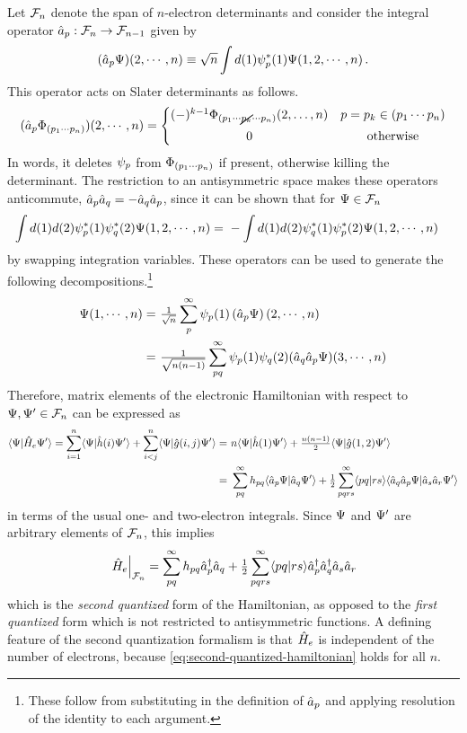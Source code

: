 \documentclass[11pt]{article}
\numberwithin{equation}{section}
\begin{document}
Let $\mathcal{F}_n$ denote the span of $n$-electron determinants and consider the integral operator $\hat{a}_p:\mathcal{F}_n\rightarrow \mathcal{F}_{n-1}$ given by
\begin{align}
  (\hat{a}_p\Psi )(2,\cdots,n)
\equiv
  \sqrt{n}\int d(1) \psi _p^*(1)\Psi (1,2,\cdots,n)\,.
\end{align}
This operator acts on Slater determinants as follows.
\begin{align}
  (\op{a}_p\F_{(p_1\cd p_n)})(2,\cd,n)
=
\left\{
\ar{
  (-)^{k-1}\F_{(p_1\cd \cancel{p_k}\cd p_n)}(2,\ld,n) & p=p_k\in(p_1\cd p_n)\\[5pt]
  0 & \text{otherwise}
}
\right.
\end{align}
In words, it deletes $\psi _p$ from $\Phi _{(p_1\cdots p_n)}$ if present, otherwise killing the determinant.
The restriction to an antisymmetric space makes these operators anticommute, $\hat{a}_p\hat{a}_q=-\hat{a}_q\hat{a}_p$, since it can be shown that for $\Psi \in\mathcal{F}_n$
\begin{align*}
  \int d(1)d(2)\psi _p^*(1)\psi _q^*(2)\Psi (1,2,\cdots,n)
=&\
-
  \int d(1)d(2)\psi _q^*(1)\psi _p^*(2)\Psi (1,2,\cdots,n)
\end{align*}
by swapping integration variables.
These operators can be used to generate the following decompositions.\footnote{These follow from substituting in the definition of $\hat{a}_p$ and applying resolution of the identity to each argument.}
\begin{align}
  \Psi (1,\cdots,n)
=&\
  \tfrac{1}{\sqrt{n}}
  \sum_p^\infty\psi _p(1)\left(\hat{a}_p\Psi \right)(2,\cdots,n)
\\=&\
  \tfrac{1}{\sqrt{n(n-1)}}
  \sum_{pq}^\infty
  \psi _p(1)\psi _q(2)(\hat{a}_q\hat{a}_p\Psi )(3,\cdots,n)
\end{align}
Therefore, matrix elements of the electronic Hamiltonian with respect to $\Psi ,\Psi '\in \mathcal{F}_n$ can be expressed as
\begin{align*}
  \langle\Psi |\hat{H}_e\Psi '\rangle
=
  \sum_{i=1}^n\langle\Psi |\hat{h}(i)\Psi '\rangle
+
  \sum_{i<j}^n\langle\Psi |\hat{g}(i,j)\Psi '\rangle
=&\
  n\langle\Psi |\hat{h}(1)\Psi '\rangle
+
  \tfrac{n(n-1)}{2}
  \langle\Psi |\hat{g}(1,2)\Psi '\rangle
\\=&\
  \sum_{pq}^\infty
  h_{pq}\langle\hat{a}_p\Psi |\hat{a}_q\Psi '\rangle
+
  \tfrac{1}{2}
  \sum_{pqrs}^\infty
  \langle pq|rs\rangle\langle\hat{a}_q\hat{a}_p\Psi |\hat{a}_s\hat{a}_r\Psi '\rangle
\end{align*}
in terms of the usual one- and two-electron integrals.
Since $\Psi $ and $\Psi '$ are arbitrary elements of $\mathcal{F}_n$, this implies
\begin{align}\label{eq:second-quantized-hamiltonian}
  \left.
  \hat{H}_e
  \right|_{\mathcal{F}_n}
=
  \sum_{pq}^\infty
  h_{pq}
  \hat{a}_p^\dagger \hat{a}_q
+
  \tfrac{1}{2}
  \sum_{pqrs}^\infty
  \langle pq|rs\rangle
  \hat{a}_p^\dagger\hat{a}_q^\dagger\hat{a}_s\hat{a}_r
\end{align}
which is the \textit{second quantized} form of the Hamiltonian, as opposed to the \textit{first quantized} form which is not restricted to antisymmetric functions.
A defining feature of the second quantization formalism is that $\hat{H}_e$ is independent of the number of electrons, because \cref{eq:second-quantized-hamiltonian} holds for all $n$.
\end{document}
